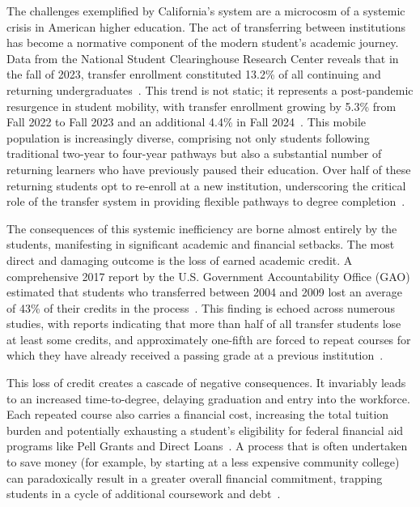 \begin{introduction}
    The challenges exemplified by California's system are a microcosm of a systemic crisis in American higher education. The act of transferring between institutions has become a normative component of the modern student's academic journey. Data from the National Student Clearinghouse Research Center reveals that in the fall of 2023, transfer enrollment constituted 13.2\% of all continuing and returning undergraduates~\cite{nscnews2023}. This trend is not static; it represents a post-pandemic resurgence in student mobility, with transfer enrollment growing by 5.3\% from Fall 2022 to Fall 2023 and an additional 4.4\% in Fall 2024~\cite{nscnews2023,nscnews20250305}. This mobile population is increasingly diverse, comprising not only students following traditional two-year to four-year pathways but also a substantial number of returning learners who have previously paused their education. Over half of these returning students opt to re-enroll at a new institution, underscoring the critical role of the transfer system in providing flexible pathways to degree completion~\cite{nscdd20250507}.

    The consequences of this systemic inefficiency are borne almost entirely by the students, manifesting in significant academic and financial setbacks. The most direct and damaging outcome is the loss of earned academic credit. A comprehensive 2017 report by the U.S. Government Accountability Office (GAO) estimated that students who transferred between 2004 and 2009 lost an average of 43\% of their credits in the process~\cite{gao2017}. This finding is echoed across numerous studies, with reports indicating that more than half of all transfer students lose at least some credits, and approximately one-fifth are forced to repeat courses for which they have already received a passing grade at a previous institution~\cite{publicagenda2025}.

    This loss of credit creates a cascade of negative consequences. It invariably leads to an increased time-to-degree, delaying graduation and entry into the workforce. Each repeated course also carries a financial cost, increasing the total tuition burden and potentially exhausting a student's eligibility for federal financial aid programs like Pell Grants and Direct Loans~\cite{gao2017}. A process that is often undertaken to save money (for example, by starting at a less expensive community college) can paradoxically result in a greater overall financial commitment, trapping students in a cycle of additional coursework and debt~\cite{collegeopportunity2017}.


\end{introduction}
